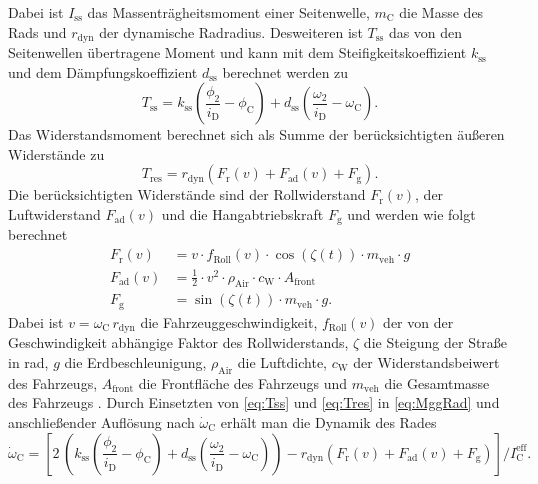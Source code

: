 Dabei ist $I_\mathrm{ss}$ das Massenträgheitsmoment einer Seitenwelle, $m_\mathrm{C}$ die Masse des Rads und $r_\mathrm{dyn}$ der dynamische Radradius. Desweiteren ist $T_\mathrm{ss}$ das von den Seitenwellen übertragene Moment und kann mit dem Steifigkeitskoeffizient $k_\mathrm{ss}$ und dem Dämpfungskoeffizient $d_\mathrm{ss}$ berechnet werden zu
\begin{equation}\label{eq:Tss}
T_\mathrm{ss} = k_\mathrm{ss}\left(\frac{\phi_2}{i_{\mathrm{D}}} - \phi_\mathrm{C}\right) + d_\mathrm{ss}\left(\frac{\omega_2}{i_{\mathrm{D}}} - \omega_\mathrm{C}\right).
\end{equation}
Das Widerstandsmoment berechnet sich als Summe der berücksichtigten äußeren Widerstände zu
\begin{equation}\label{eq:Tres}
T_\mathrm{res} = r_\mathrm{dyn}\left(F_\mathrm{r}(v) + F_\mathrm{ad}(v) + F_\mathrm{g}\right). 
\end{equation}
Die berücksichtigten Widerstände sind der Rollwiderstand $F_\mathrm{r}(v)$, der Luftwiderstand $F_\mathrm{ad}(v)$ und die Hangabtriebskraft $F_\mathrm{g}$ und werden wie folgt berechnet
\begin{subequations}
\begin{align}
F_\mathrm{r}(v) &= v \cdot f_\mathrm{Roll}(v)\cdot \cos\left(\zeta(t)\right)\cdot m_\mathrm{veh}\cdot g \\
F_\mathrm{ad}(v) &= \frac{1}{2}\cdot v^2\cdot\rho_\mathrm{Air}\cdot c_\mathrm{W}\cdot A_\mathrm{front}\\
F_\mathrm{g} &= \sin\left(\zeta(t)\right)\cdot m_\mathrm{veh}\cdot g.
\end{align}
\end{subequations}
Dabei ist $v = \omega_\mathrm{C}\,r_\mathrm{dyn}$ die Fahrzeuggeschwindigkeit, $f_\mathrm{Roll}(v)$ der von der Geschwindigkeit abhängige Faktor
des Rollwiderstands, $\zeta$ die Steigung der Straße in rad, $g$ die Erdbeschleunigung, $\rho_\mathrm{Air}$ die Luftdichte, $c_\mathrm{W}$ der Widerstandsbeiwert des Fahrzeugs, $A_\mathrm{front}$ die Frontfläche des
Fahrzeugs und $m_\mathrm{veh}$ die Gesamtmasse des Fahrzeugs \cite[S.~3ff]{Naunheimer.2007}.
Durch Einsetzten von \eqref{eq:Tss} und \eqref{eq:Tres} in \eqref{eq:MggRad} und anschließender Auflösung nach $\dot{\omega}_\mathrm{C}$ erhält man die Dynamik des Rades
\begin{equation}\label{eq:dynwc}
\dot{\omega}_\mathrm{C} = \left[ 2\,\left(k_\mathrm{ss}\left(\frac{\phi_2}{i_{\mathrm{D}}} - \phi_\mathrm{C}\right) + d_\mathrm{ss}\left(\frac{\omega_2}{i_{\mathrm{D}}} - \omega_\mathrm{C}\right)\right) - r_\mathrm{dyn}\left(F_\mathrm{r}(v) + F_\mathrm{ad}(v) + F_\mathrm{g}\right)\right]/I^\mathrm{eff}_\mathrm{C}.
\end{equation}
